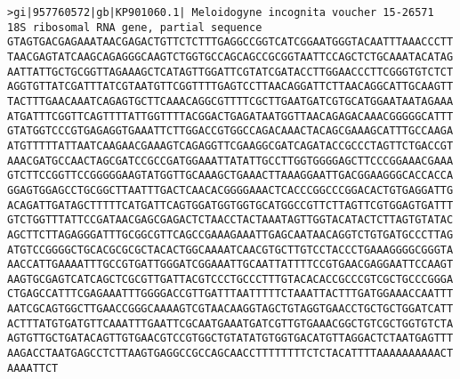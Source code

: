 \documentclass[11pt]{article}
\begin{document}
\begin{Verbatim}[commandchars=\\\{\}]
>gi|957760572|gb|KP901060.1| Meloidogyne incognita voucher 15-26571 18S ribosomal RNA gene, partial sequence
GTAGTGACGAGAAATAACGAGACTGTTCTCTTTGAGGCCGGTCATCGGAATGGGTACAATTTAAACCCTT
TAACGAGTATCAAGCAGAGGGCAAGTCTGGTGCCAGCAGCCGCGGTAATTCCAGCTCTGCAAATACATAG
AATTATTGCTGCGGTTAGAAAGCTCATAGTTGGATTCGTATCGATACCTTGGAACCCTTCGGGTGTCTCT
AGGTGTTATCGATTTATCGTAATGTTCGGTTTTGAGTCCTTAACAGGATTCTTAACAGGCATTGCAAGTT
TACTTTGAACAAATCAGAGTGCTTCAAACAGGCGTTTTCGCTTGAATGATCGTGCATGGAATAATAGAAA
ATGATTTCGGTTCAGTTTTATTGGTTTTACGGACTGAGATAATGGTTAACAGAGACAAACGGGGGCATTT
GTATGGTCCCGTGAGAGGTGAAATTCTTGGACCGTGGCCAGACAAACTACAGCGAAAGCATTTGCCAAGA
ATGTTTTTATTAATCAAGAACGAAAGTCAGAGGTTCGAAGGCGATCAGATACCGCCCTAGTTCTGACCGT
AAACGATGCCAACTAGCGATCCGCCGATGGAAATTATATTGCCTTGGTGGGGAGCTTCCCGGAAACGAAA
GTCTTCCGGTTCCGGGGGAAGTATGGTTGCAAAGCTGAAACTTAAAGGAATTGACGGAAGGGCACCACCA
GGAGTGGAGCCTGCGGCTTAATTTGACTCAACACGGGGAAACTCACCCGGCCCGGACACTGTGAGGATTG
ACAGATTGATAGCTTTTTCATGATTCAGTGGATGGTGGTGCATGGCCGTTCTTAGTTCGTGGAGTGATTT
GTCTGGTTTATTCCGATAACGAGCGAGACTCTAACCTACTAAATAGTTGGTACATACTCTTAGTGTATAC
AGCTTCTTAGAGGGATTTGCGGCGTTCAGCCGAAAGAAATTGAGCAATAACAGGTCTGTGATGCCCTTAG
ATGTCCGGGGCTGCACGCGCGCTACACTGGCAAAATCAACGTGCTTGTCCTACCCTGAAAGGGGCGGGTA
AACCATTGAAAATTTGCCGTGATTGGGATCGGAAATTGCAATTATTTTCCGTGAACGAGGAATTCCAAGT
AAGTGCGAGTCATCAGCTCGCGTTGATTACGTCCCTGCCCTTTGTACACACCGCCCGTCGCTGCCCGGGA
CTGAGCCATTTCGAGAAATTTGGGGACCGTTGATTTAATTTTTCTAAATTACTTTGATGGAAACCAATTT
AATCGCAGTGGCTTGAACCGGGCAAAAGTCGTAACAAGGTAGCTGTAGGTGAACCTGCTGCTGGATCATT
ACTTTATGTGATGTTCAAATTTGAATTCGCAATGAAATGATCGTTGTGAAACGGCTGTCGCTGGTGTCTA
AGTGTTGCTGATACAGTTGTGAACGTCCGTGGCTGTATATGTGGTGACATGTTAGGACTCTAATGAGTTT
AAGACCTAATGAGCCTCTTAAGTGAGGCCGCCAGCAACCTTTTTTTTCTCTACATTTTAAAAAAAAAACT
AAAATTCT


\end{Verbatim}
\end{document}
